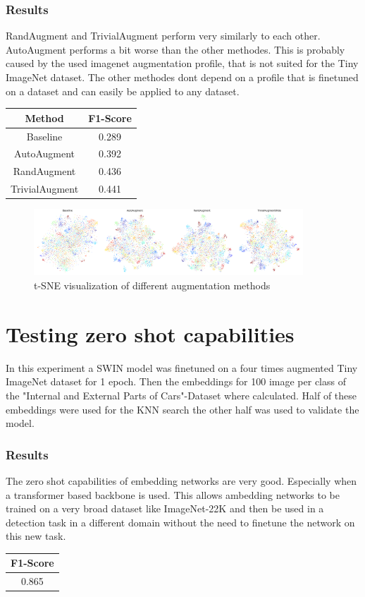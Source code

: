 \documentclass[12pt,a4paper]{report}
\newcommand{\splitlayout}[2]{
	\begin{minipage}{0.6\textwidth}
		#1
	\end{minipage}
	\hfill
	\begin{minipage}{0.35\textwidth}
		#2
	\end{minipage}	
}
\begin{document}
\subsubsection{Results}
\splitlayout{
	RandAugment and TrivialAugment perform very similarly to each other.
	AutoAugment performs a bit worse than the other methodes.
	This is probably caused by the used imagenet augmentation profile, that is not suited for the Tiny ImageNet dataset.
	The other methodes dont depend on a profile that is finetuned on a dataset and can easily be applied to any dataset. 
}{
	\begin{tabular}{ | c | c | }
		\hline
		Method &  F1-Score \\ 
		\hline
		Baseline &  0.289  \\ 
		\hline
		AutoAugment & 0.392 \\ 
		\hline
		RandAugment & 0.436 \\ 
		\hline
		TrivialAugment & 0.441  \\ 
		\hline
	\end{tabular}
}

\begin{figure}[hb]
	\centering
	\includegraphics[width=0.9\textwidth]{../plots/augmentation_methods.png}
	\caption{t-SNE visualization of different augmentation methods}
\end{figure}

\newpage

\section{Testing zero shot capabilities}
In this experiment a SWIN model was finetuned on a four times augmented Tiny ImageNet dataset for 1 epoch.
Then the embeddings for 100 image per class of the "Internal and External Parts of Cars"-Dataset where calculated.
Half of these embeddings were used for the KNN search the other half was used to validate the model.

\subsubsection{Results}
\splitlayout{
The zero shot capabilities of embedding networks are very good.
Especially when a transformer based backbone is used.
This allows ambedding networks to be trained on a very broad dataset like ImageNet-22K and then be used in a detection task in a different domain without the need to finetune the network on this new task.

}{
	\begin{tabular}{ | c | }
		\hline
		F1-Score \\ 
		\hline
		0.865  \\ 
		\hline
	\end{tabular}
}
\end{document}
